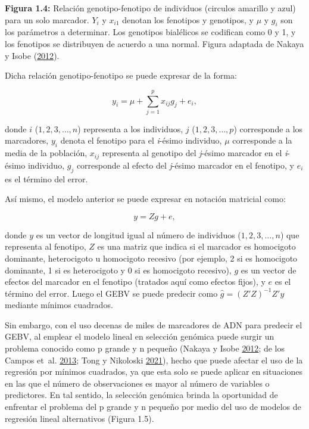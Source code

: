 \documentclass[11pt,spanish,a4paper,oneside,]{book} %
\begin{document}
\begin{center}
\textbf{Figura 1.4:} Relación genotipo-fenotipo de individuos (circulos amarillo y azul) para un solo marcador. \(Y_{i}\) y \(x_{i1}\) denotan los fenotipos y genotipos, y \(\mu\) y \(g_{i}\) son los parámetros a determinar. Los genotipos bialélicos se codifican como 0 y 1, y los fenotipos se distribuyen de acuerdo a una normal. Figura adaptada de Nakaya y Isobe (\protect\hyperlink{ref-cite:6}{2012}).

\end{center}

Dicha relación genotipo-fenotipo se puede expresar de la forma:

\begin{equation}
y_{i} = \mu + \sum_{j = 1}^{p}x_{ij}g_{j} + e_{i},
\end{equation}

donde \(i\) (\(1, 2, 3, …, n\)) representa a los individuos, \(j\) (\(1, 2, 3, …, p\)) corresponde a los marcadores, \(y_{i}\) denota el fenotipo para el \emph{i}-ésimo individuo, \(\mu\) corresponde a la media de la población, \(x_{ij}\) representa al genotipo del \emph{j}-ésimo marcador en el \emph{i}-ésimo individuo, \(g_{j}\) corresponde al efecto del \emph{j}-ésimo marcador en el fenotipo, y \(e_{i}\) es el término del error.

Así mismo, el modelo anterior se puede expresar en notación matricial como:

\begin{equation}
y = Zg + e,
\end{equation}

donde \(y\) es un vector de longitud igual al número de individuos (\(1, 2, 3, …, n\)) que representa al fenotipo, \(Z\) es una matriz que indica si el marcador es homocigoto dominante, heterocigoto u homocigoto recesivo (por ejemplo, 2 si es homocigoto dominante, 1 si es heterocigoto y 0 si es homocigoto recesivo), \(g\) es un vector de efectos del marcador en el fenotipo (tratados aquí como efectos fijos), y \(e\) es el término del error. Luego el GEBV se puede predecir como \(\hat{g} = (Z'Z)^{- 1} Z'y\) mediante mínimos cuadrados.

Sin embargo, con el uso decenas de miles de marcadores de ADN para predecir el GEBV, al emplear el modelo lineal en selección genómica puede surgir un problema conocido como p grande y n pequeño (Nakaya y Isobe \protect\hyperlink{ref-cite:6}{2012}; de los Campos et~al. \protect\hyperlink{ref-cite:31}{2013}; Tong y Nikoloski \protect\hyperlink{ref-cite:7}{2021}), hecho que puede afectar el uso de la regresión por mínimos cuadrados, ya que esta solo se puede aplicar en situaciones en las que el número de observaciones es mayor al número de variables o predictores. En tal sentido, la selección genómica brinda la oportunidad de enfrentar el problema del p grande y n pequeño por medio del uso de modelos de regresión lineal alternativos (Figura 1.5).
\end{document}
